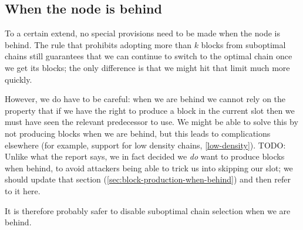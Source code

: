 \subsection{When the node is behind}

To a certain extend, no special provisions need to be made when the node is
behind. The rule that prohibits adopting more than $k$ blocks from suboptimal
chains still guarantees that we can continue to switch to the optimal chain
once we get its blocks; the only difference is that we might hit that limit
much more quickly.

However, we do have to be careful: when we are behind we cannot rely on the
property that if we have the right to produce a block in the current slot then
we must have seen the relevant predecessor to use. We might be able to solve
this by not producing blocks when we are behind, but this leads to complications
elsewhere (for example, support for low density chains, \cref{low-density}).
TODO: Unlike what the report says, we in fact decided we \emph{do}
want to produce blocks when behind, to avoid attackers being able to trick us
into skipping our slot; we should update that section
(\cref{sec:block-production-when-behind}) and then refer to it here.

It is therefore probably safer to disable suboptimal chain selection when we
are behind.

